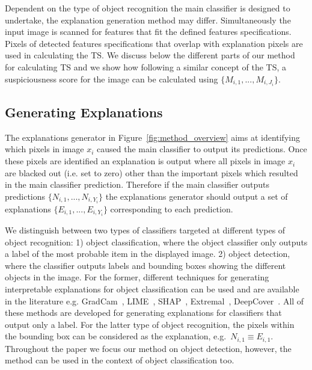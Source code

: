 Dependent on the type of object recognition the main classifier is designed to undertake, the explanation generation method may differ.
%
%
Simultaneously the input image is scanned for features that fit the defined features specifications. Pixels of detected features specifications that overlap with explanation pixels are used in calculating the TS.
%
We discuss below the different parts of our method for calculating TS and we show how following a similar concept of the TS, a suspiciousness score for the image can be calculated using $\{M_{i,1},..., M_{i,J_i}\}$.


\subsection{Generating Explanations}
The explanations generator in Figure~\ref{fig:method_overview}
aims at identifying which pixels in image $x_i$ caused the main classifier to output its predictions. Once these pixels are identified an explanation is output where all pixels in image $x_i$ are blacked out (i.e. set to zero) other than the important pixels which resulted in the main classifier prediction. Therefore if the main classifier outputs predictions $\{N_{i,1},..., N_{i,Y_i}\}$ the explanations generator should output a set of explanations $\{E_{i,1},..., E_{i,Y_i}\}$ corresponding to each prediction.  

We distinguish between two types of classifiers targeted at different types of object recognition: 1) object classification, where the object classifier only outputs a label of the most probable item in the displayed image. 2) object detection, where the classifier outputs labels and bounding boxes showing the different objects in the image.
%
For the former, different techniques for generating interpretable explanations for object classification can be used and are available in the literature e.g. GradCam~\cite{Selvaraju2020}, LIME~\cite{Ribeiro2016}, SHAP~\cite{Lundberg2017}, Extremal~\cite{Fong2019}, DeepCover~\cite{Sun2020}. 
%
All of these methods are developed for generating explanations for classifiers that output only a label.%
%
For the latter type of object recognition, the pixels within the bounding box can be considered as the explanation, e.g.\ $N_{i,1}\equiv E_{i,1}$.
%
%
Throughout the paper we focus our method on object detection, however, the method can be used in the context of object classification too. 
 

